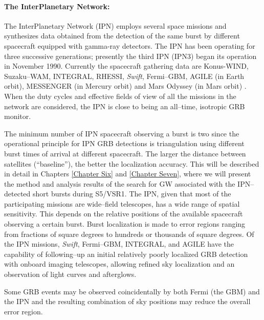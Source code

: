 \paragraph{The InterPlanetary Network:}
The InterPlanetary Network (IPN) \cite{Hurley:2002wv, Hurley:1999ym} employs several space missions and synthesizes data obtained from the detection of the same burst by different spacecraft equipped with gamma-ray detectors. The IPN has been operating for three successive generations; presently the third IPN (IPN3) began its operation in November 1990. Currently the spacecraft gathering data are Konus-WIND, Suzaku--WAM, INTEGRAL,  RHESSI, \emph{Swift}, Fermi--GBM, AGILE (in Earth orbit), MESSENGER (in Mercury orbit) and Mars Odyssey (in Mars orbit) \cite{HurleyHTML}. When the duty cycles and effective fields of view of all the missions in the network are considered, the IPN is close to being an all--time, isotropic GRB monitor. 

The minimum number of IPN spacecraft observing a burst is two since the operational principle for IPN GRB detections is triangulation using different burst times of arrival at different spacecraft. The larger the distance between satellites (``baseline''), the better the localization accuracy. This will be described in detail in Chapters \ref{Chapter Six} and \ref{Chapter Seven}, where we will present the method and analysis results of the search for GW associated with the IPN--detected short bursts during S5/VSR1. The IPN, given that most of the participating missions are wide--field telescopes, has a wide range of spatial sensitivity. This depends on the relative positions of the available spacecraft observing a certain burst. Burst localization is made to error regions ranging from fractions of square degrees to hundreds or thousands of square degrees. Of the IPN missions, \emph{Swift}, Fermi--GBM, INTEGRAL, and AGILE have the capability of following--up an initial relatively poorly localized GRB detection with onboard imaging telescopes, allowing refined sky localization and an observation of light curves and afterglows.

Some GRB events may be observed coincidentally by both Fermi (the GBM) and the IPN and the resulting combination of sky positions may reduce the overall error region.

